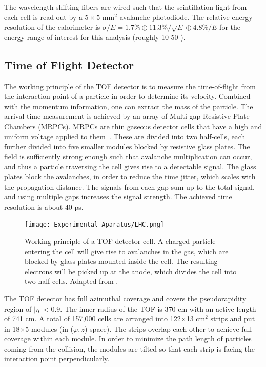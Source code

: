 The wavelength shifting fibers are wired such that the scintillation light from each cell is read out by a $5\times5$ mm$^2$ avalanche photodiode. The relative energy resolution of the calorimeter is $\sigma/E = 1.7\% \oplus 11.3\%/\sqrt{E} \oplus 4.8\%/E$ for the energy range of interest for this analysis (roughly 10-50 \GeVc).


\subsection{Time of Flight Detector}
\label{sec:TOF}
The working principle of the TOF detector is to measure the time-of-flight from the interaction point of a particle in order to determine its velocity. Combined with the momentum information, one can extract the mass of the particle. The arrival time measurement is achieved by an array of Multi-gap Resistive-Plate Chambers (MRPCs). MRPCs are thin gaseous detector cells that have a high and uniform voltage applied to them~\cite{Aamodt:2008zz}. These are divided into two half-cells, each further divided into five smaller modules blocked by resistive glass plates. The field is sufficiently strong enough such that avalanche multiplication can occur, and thus a particle traversing the cell gives rise to a detectable signal. The glass plates block the avalanches, in order to reduce the time jitter, which scales with the propagation distance. The signals from each gap sum up to the total signal, and using multiple gaps increases the signal strength. The achieved time resolution is about 40 ps.

\begin{figure}[htpb]
  \centering
  \texttt{[image: Experimental\_Aparatus/LHC.png]}
  \caption{Working principle of a TOF detector cell. A charged particle entering the cell will give rise to avalanches in the gas, which are blocked by glass plates mounted inside the cell. The resulting electrons will be picked up at the anode, which divides the cell into two half cells. Adapted from \cite{Adolfsson2020}.}
  \label{fig:TOF}
\end{figure}

The TOF detector has full azimuthal coverage and covers the pseudorapidity region of $|\eta| < 0.9$. The inner radius of the TOF is 370 cm with an active length of 741 cm. A total of 157,000 cells are arranged into 122$\times$13 cm$^2$ strips and put in 18$\times$5 modules (in ($\varphi,z$) space). The strips overlap each other to achieve full coverage within each module. In order to minimize the path length of particles coming from the collision, the modules are tilted so that each strip is facing the interaction point perpendicularly.

